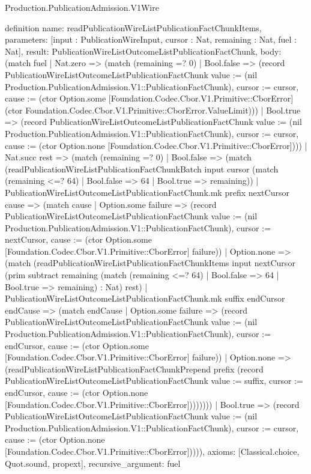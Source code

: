 \begin{lexlean}{Production.PublicationAdmission.V1Wire}
\begin{semanticmodule}
definition{
  name: readPublicationWireListPublicationFactChunkItems,
  parameters: [input : PublicationWireInput, cursor : Nat, remaining : Nat, fuel : Nat],
  result: PublicationWireListOutcomeListPublicationFactChunk,
  body: (match fuel
    | Nat.zero => (match (remaining =? 0)
      | Bool.false => (record PublicationWireListOutcomeListPublicationFactChunk {value := (nil Production.PublicationAdmission.V1::PublicationFactChunk), cursor := cursor, cause := (ctor Option.some [Foundation.Codec.Cbor.V1.Primitive::CborError] (ctor Foundation.Codec.Cbor.V1.Primitive::CborError.ValueLimit))})
      | Bool.true => (record PublicationWireListOutcomeListPublicationFactChunk {value := (nil Production.PublicationAdmission.V1::PublicationFactChunk), cursor := cursor, cause := (ctor Option.none [Foundation.Codec.Cbor.V1.Primitive::CborError])}))
    | Nat.succ rest => (match (remaining =? 0)
      | Bool.false => (match (readPublicationWireListPublicationFactChunkBatch input cursor (match (remaining <=? 64)
          | Bool.false => 64
          | Bool.true => remaining))
        | PublicationWireListOutcomeListPublicationFactChunk.mk prefix nextCursor cause => (match cause
          | Option.some failure => (record PublicationWireListOutcomeListPublicationFactChunk {value := (nil Production.PublicationAdmission.V1::PublicationFactChunk), cursor := nextCursor, cause := (ctor Option.some [Foundation.Codec.Cbor.V1.Primitive::CborError] failure)})
          | Option.none => (match (readPublicationWireListPublicationFactChunkItems input nextCursor (prim subtract remaining (match (remaining <=? 64)
              | Bool.false => 64
              | Bool.true => remaining) : Nat) rest)
            | PublicationWireListOutcomeListPublicationFactChunk.mk suffix endCursor endCause => (match endCause
              | Option.some failure => (record PublicationWireListOutcomeListPublicationFactChunk {value := (nil Production.PublicationAdmission.V1::PublicationFactChunk), cursor := endCursor, cause := (ctor Option.some [Foundation.Codec.Cbor.V1.Primitive::CborError] failure)})
              | Option.none => (readPublicationWireListPublicationFactChunkPrepend prefix (record PublicationWireListOutcomeListPublicationFactChunk {value := suffix, cursor := endCursor, cause := (ctor Option.none [Foundation.Codec.Cbor.V1.Primitive::CborError])}))))))
      | Bool.true => (record PublicationWireListOutcomeListPublicationFactChunk {value := (nil Production.PublicationAdmission.V1::PublicationFactChunk), cursor := cursor, cause := (ctor Option.none [Foundation.Codec.Cbor.V1.Primitive::CborError])}))),
  axioms: [Classical.choice, Quot.sound, propext],
  recursive_argument: fuel
}


\end{semanticmodule}
\end{lexlean}
